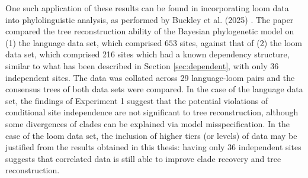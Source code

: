 One such application of these results can be found in incorporating loom data into phylolinguistic analysis, as performed by Buckley et al. (2025) \cite{Buckley2025}. The paper compared the tree reconstruction ability of the Bayesian phylogenetic model on (1) the language data set, which comprised $653$ sites, against that of (2) the loom data set, which comprised 216 sites which had a known dependency structure, similar to what has been described in Section \ref{sec:dependent}, with only 36 independent sites. The data was collated across 29 language-loom pairs and the consensus trees of both data sets were compared. In the case of the language data set, the findings of Experiment 1 suggest that the potential violations of conditional site independence are not significant to tree reconstruction, although some divergences of clades can be explained via model misspecification. In the case of the loom data set, the inclusion of higher tiers (or levels) of data may be justified from the results obtained in this thesis: having only 36 independent sites suggests that correlated data is still able to improve clade recovery and tree reconstruction. 